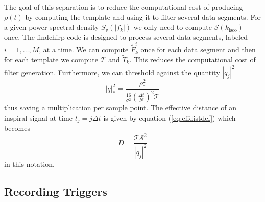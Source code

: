 The goal of this separation is to reduce the computational
cost of producing $\rho(t)$ by computing the template and using it to filter
several data segments. For a given power spectral density $S_v(|f_k|)$ we
only need to compute $\mathcal{S}(k_\mathrm{isco})$ once. The findchirp code
is designed to process several data segments, labeled $i = 1,\ldots,M$, at a
time. We can compute $\tilde{F}_k^i$ once for  each data segment and then for
each template we compute $\mathcal{T}$ and $\tilde{T}_k$. 
This reduces the computational cost of filter generation.
Furthermore, we can threshold against the quantity $|q_j|^2$
\begin{equation}
|q|^2_\ast = \frac{\rho^2_\ast} 
{\frac{16}{\sigma^2}\left(\frac{\Delta t}{N}\right)^2 \mathcal{T}}
\label{eq:qopstat}
\end{equation}
thus saving a multiplication per sample point.
The effective distance of an inspiral signal at time $t_j = j\Delta t$ is
given by equation (\ref{eq:effdistdef}) which becomes
\begin{equation}
D = \frac{\mathcal{T}\mathcal{S}^2}{|q_j|^2}
\end{equation}
in this notation.

\subsection{Recording Triggers}
\label{ss:record}

